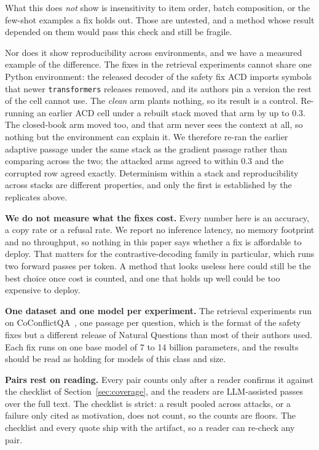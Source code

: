 What this does \emph{not} show is insensitivity to item order, batch
composition, or the few-shot examples a fix holds out. Those are untested,
and a method whose result depended on them would pass this check and still be
fragile.

Nor does it show reproducibility across environments, and we have a
measured example of the difference. The fixes in the retrieval experiments cannot
share one Python environment: the released decoder of the safety fix ACD imports symbols that
newer \texttt{transformers} releases removed, and its authors pin a version
the rest of the cell cannot use. The \emph{clean} arm plants nothing, so its result is a
control. Re-running an earlier ACD cell under a rebuilt stack moved that arm
by up to 0.3\pp{}. The closed-book arm moved too, and
that arm never sees the context at all, so nothing but the environment can
explain it. We therefore re-ran the earlier adaptive passage under the same
stack as the gradient passage rather than comparing across the two; the
attacked arms agreed to within 0.3\pp{} and the corrupted row agreed exactly.
Determinism within a stack and reproducibility across stacks are different
properties, and only the first is established by the replicates above.

\textbf{We do not measure what the fixes cost.} Every number here is an
accuracy, a copy rate or a refusal rate. We report no inference latency,
no memory footprint and no throughput, so nothing in this paper says whether a
fix is affordable to deploy. That matters for the contrastive-decoding
family in particular, which runs two forward passes per token. A method that looks useless here could still be the best choice once
cost is counted, and one that holds up well could be too expensive to
deploy.

\textbf{One dataset and one model per experiment.} The retrieval experiments
run on CoConflictQA~\cite{huang-2025-parammute}, one passage per question,
which is the format of the safety fixes but a different release of Natural
Questions than most of their authors used. Each fix runs on one base model of
7 to 14 billion parameters, and the results should be read as holding for
models of this class and size.

\textbf{Pairs rest on reading.} Every pair counts only after a reader
confirms it against the checklist of Section~\ref{sec:coverage}, and the
readers are LLM-assisted passes over the full text. The checklist is strict:
a result pooled across attacks, or a failure only cited as motivation, does
not count, so the counts are floors. The checklist and every quote ship with the artifact, so a
reader can re-check any pair.

